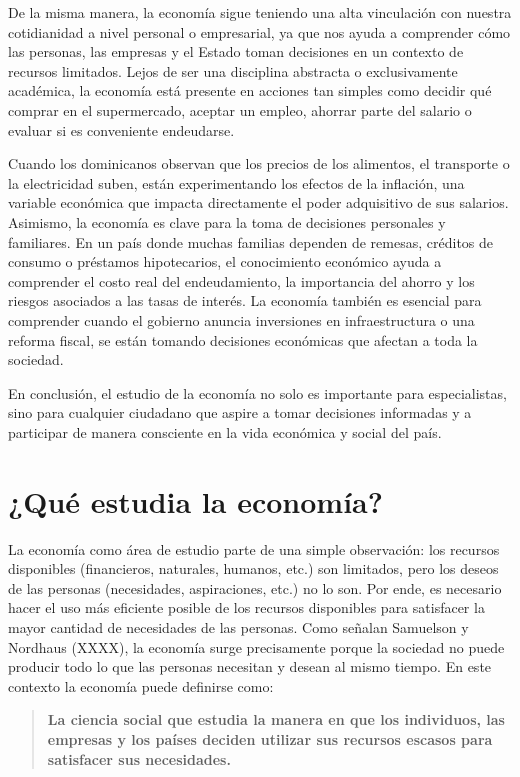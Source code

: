 \documentclass[
  letterpaper,
  DIV=11,
  numbers=noendperiod,
  oneside]{scrreprt}
\begin{document}
De la misma manera, la economía sigue teniendo una alta vinculación con
nuestra cotidianidad a nivel personal o empresarial, ya que nos ayuda a
comprender cómo las personas, las empresas y el Estado toman decisiones
en un contexto de recursos limitados. Lejos de ser una disciplina
abstracta o exclusivamente académica, la economía está presente en
acciones tan simples como decidir qué comprar en el supermercado,
aceptar un empleo, ahorrar parte del salario o evaluar si es conveniente
endeudarse.

Cuando los dominicanos observan que los precios de los alimentos, el
transporte o la electricidad suben, están experimentando los efectos de
la inflación, una variable económica que impacta directamente el poder
adquisitivo de sus salarios. Asimismo, la economía es clave para la toma
de decisiones personales y familiares. En un país donde muchas familias
dependen de remesas, créditos de consumo o préstamos hipotecarios, el
conocimiento económico ayuda a comprender el costo real del
endeudamiento, la importancia del ahorro y los riesgos asociados a las
tasas de interés. La economía también es esencial para comprender cuando
el gobierno anuncia inversiones en infraestructura o una reforma fiscal,
se están tomando decisiones económicas que afectan a toda la sociedad.

En conclusión, el estudio de la economía no solo es importante para
especialistas, sino para cualquier ciudadano que aspire a tomar
decisiones informadas y a participar de manera consciente en la vida
económica y social del país.

\section{¿Qué estudia la economía?}\label{quuxe9-estudia-la-economuxeda}

La economía como área de estudio parte de una simple observación: los
recursos disponibles (financieros, naturales, humanos, etc.) son
limitados, pero los deseos de las personas (necesidades, aspiraciones,
etc.) no lo son. Por ende, es necesario hacer el uso más eficiente
posible de los recursos disponibles para satisfacer la mayor cantidad de
necesidades de las personas. Como señalan Samuelson y Nordhaus (XXXX),
la economía surge precisamente porque la sociedad no puede producir todo
lo que las personas necesitan y desean al mismo tiempo. En este contexto
la economía puede definirse como:

\begin{quote}
\textbf{La ciencia social que estudia la manera en que los individuos,
las empresas y los países deciden utilizar sus recursos escasos para
satisfacer sus necesidades.}
\end{quote}
\end{document}

